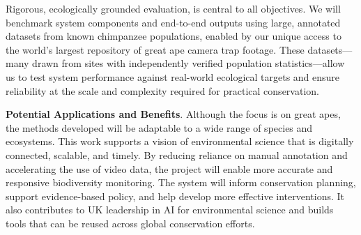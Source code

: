 Rigorous, ecologically grounded evaluation, is central to all objectives. We will benchmark system components and end-to-end outputs using large, annotated datasets from known chimpanzee populations, enabled by our unique access to the world’s largest repository of great ape camera trap footage. These datasets—many drawn from sites with independently verified population statistics—allow us to test system performance against real-world ecological targets and ensure reliability at the scale and complexity required for practical conservation.

\textbf{Potential Applications and Benefits}. Although the focus is on great apes, the methods developed will be adaptable to a wide range of species and ecosystems. This work supports a vision of environmental science that is digitally connected, scalable, and timely. By reducing reliance on manual annotation and accelerating the use of video data, the project will enable more accurate and responsive biodiversity monitoring. The system will inform conservation planning, support evidence-based policy, and help develop more effective interventions. It also contributes to UK leadership in AI for environmental science and builds tools that can be reused across global conservation efforts. 



